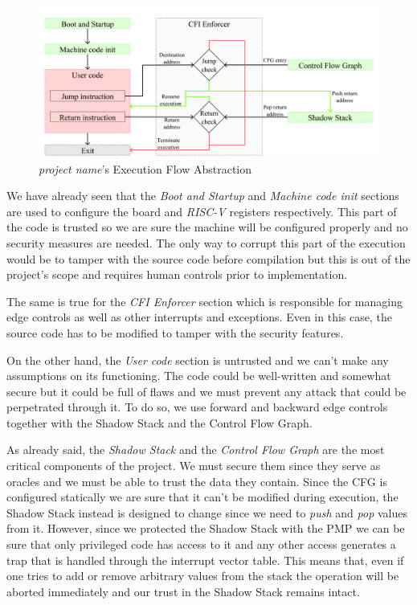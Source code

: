 \begin{figure}[htbp]
  \centering
  \includegraphics[width=.9\linewidth]{images/functioning.png}
  \caption{\textit{project name}'s Execution Flow Abstraction}
  \label{fig:functioning}
\end{figure}

We have already seen that the \textit{Boot and Startup} and \textit{Machine code
init} sections are used to configure the board and \textit{RISC-V} registers
respectively. This part of the code is trusted so we are sure the machine will be
configured properly and no security measures are needed. The only way to corrupt
this part of the execution would be to tamper with the source code before
compilation but this is out of the project's scope and requires human controls
prior to implementation.

The same is true for the \textit{CFI Enforcer} section which is responsible for managing
edge controls as well as other interrupts and exceptions. Even in this case, the
source code has to be modified to tamper with the security features.

On the other hand, the \textit{User code} section is untrusted and we can't make
any assumptions on its functioning. The code could be well-written and somewhat
secure but it could be full of flaws and we must prevent any attack that could
be perpetrated through it. To do so, we use forward and backward edge controls
together with the Shadow Stack and the Control Flow Graph.

As already said, the \textit{Shadow Stack} and the \textit{Control Flow Graph} are
the most critical components of the project. We must secure them since they
serve as oracles and we must be able to trust the data they contain. Since the CFG
is configured statically we are sure that it can't be modified during execution,
the Shadow Stack instead is designed to change since we need to \textit{push} and
\textit{pop} values from it. However, since we protected the Shadow Stack with
the PMP we can be sure that only privileged code has access to it and any other
access generates a trap that is handled through the interrupt vector table. This
means that, even if one tries to add or remove arbitrary values from the stack
the operation will be aborted immediately and our trust in the Shadow Stack
remains intact.

